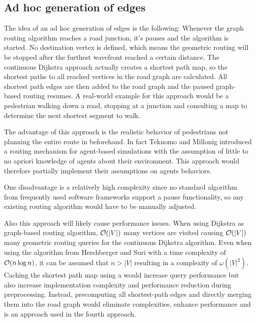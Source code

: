 	\subsection{Ad hoc generation of edges}
	
		The idea of an ad hoc generation of edges is the following:
		Whenever the graph routing algorithm reaches a road junction, it's pauses and the  algorithm is started.
		No destination vertex is defined, which means the geometric routing will be stopped after the furthest wavefront reached a certain distance.
		The continuous Dijkstra approach actually creates a shortest path map, so the shortest paths to all reached vertices in the road graph are calculated.
		All shortest path edges are then added to the road graph and the paused graph-based routing resumes.
		A real-world example for this approach would be a pedestrian walking down a road, stopping at a junction and consulting a map to determine the next shortest segment to walk.
		
		The advantage of this approach is the realistic behavior of pedestrians not planning the entire route in beforehand.
		In fact Teknomo and Millonig introduced a routing mechanism for agent-based simulations with the assumption of little to no apriori knowledge of agents about their environment\cite{teknomo-millonig-routing}.
		This approach would therefore partially implement their assumptions on agents behaviors.
		
		One disadvantage is a relatively high complexity since no standard algorithm from frequently used software frameworks support a pause functionality, so any existing routing algorithm would have to be manually adjusted.

		Also this approach will likely cause performance issues.
		When using Dijkstra as graph-based routing algorithm, $\mathcal{O}(|V|)$ many vertices are visited causing $\mathcal{O}(|V|)$ many  geometric routing queries for the continuous Dijkstra algorithm.
		Even when using the algorithm from Hershberger and Suri\cite{hershberger-suri} with a time complexity of $\mathcal{O}(n \log n)$, it can be assumed that $n > |V|$ resulting in a complexity of $\omega(|V|^2)$.
		Caching the shortest path map using a  would increase query performance but also increase implementation complexity and performance reduction during preprocessing.
		Instead, precomputing all shortest-path edges and directly merging them into the road graph would eliminate complexities, enhance performance and is an approach used in the fourth approach.
		
